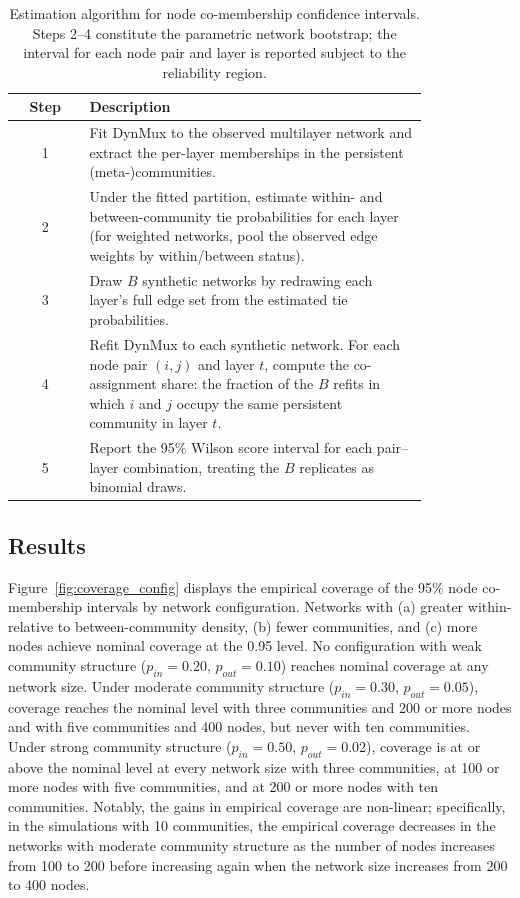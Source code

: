 \documentclass[11pt, letterpaper]{article}
\begin{document}
\begin{table}[t]
\footnotesize
\centering
\caption{Estimation algorithm for node co-membership confidence intervals.
Steps 2--4 constitute the parametric network bootstrap; the interval for each
node pair and layer is reported subject to the reliability region.}
\label{tab:ci_algorithm}
\begin{tabular}{cp{0.82\linewidth}}
\toprule
Step & Description \\
\midrule
1 & Fit DynMux to the observed multilayer network and extract the
    per-layer memberships in the persistent (meta-)communities. \\
2 & Under the fitted partition, estimate within- and between-community tie
    probabilities for each layer (for weighted networks, pool the observed
    edge weights by within/between status). \\
3 & Draw $B$ synthetic networks by redrawing each layer's full edge set from
    the estimated tie probabilities. \\
4 & Refit DynMux to each synthetic network. For each node pair $(i,j)$ and layer $t$, compute the co-assignment
    share: the fraction of the $B$ refits in which $i$ and $j$ occupy the
    same persistent community in layer $t$. \\
5 & Report the 95\% Wilson score interval for each pair--layer combination,
    treating the $B$ replicates as binomial draws. \\
\bottomrule
\end{tabular}
\end{table}

\subsection{Results}
Figure~\ref{fig:coverage_config} displays the empirical coverage of the 95\% node co-membership intervals by network configuration. Networks with (a) greater within- relative to between-community density, (b) fewer communities, and (c) more nodes achieve nominal coverage at the 0.95 level. No configuration with weak community structure ($p_{in} = 0.20$, $p_{out} = 0.10$) reaches nominal coverage at any network size. Under moderate community structure ($p_{in} = 0.30$, $p_{out} = 0.05$), coverage reaches the nominal level with three communities and 200 or more nodes and with five communities and 400 nodes, but never with ten communities. Under strong community structure ($p_{in} = 0.50$, $p_{out} = 0.02$), coverage is at or above the nominal level at every network size with three communities, at 100 or more nodes with five communities, and at 200 or more nodes with ten communities. Notably, the gains in empirical coverage are non-linear; specifically, in the simulations with 10 communities, the empirical coverage decreases in the networks with moderate community structure as the number of nodes increases from 100 to 200 before increasing again when the network size increases from 200 to 400 nodes.
\end{document}
